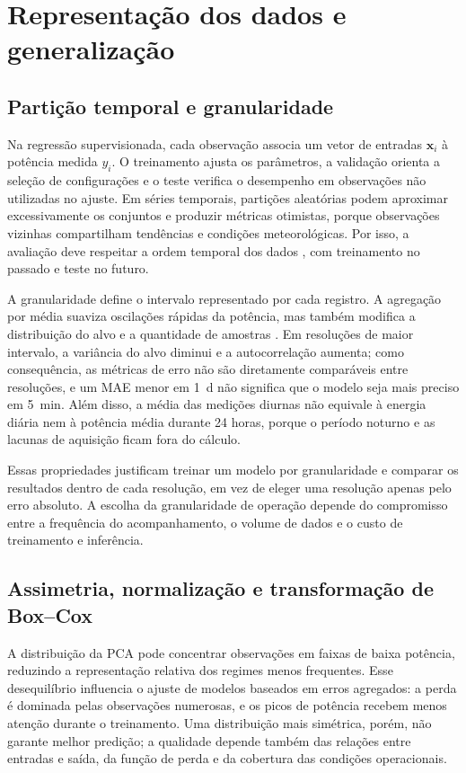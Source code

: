 {
\section{Representação dos dados e generalização}
\label{sec:ft-dados}}

\subsection{Partição temporal e granularidade}
\label{subsec:ft-granularidade}

Na regressão supervisionada, cada observação associa um vetor de
entradas $\mathbf{x}_i$ à potência medida $y_i$. O treinamento ajusta os
parâmetros, a validação orienta a seleção de configurações e o teste
verifica o desempenho em observações não utilizadas no ajuste. Em séries
temporais, partições aleatórias podem aproximar excessivamente os
conjuntos e produzir métricas otimistas, porque observações vizinhas
compartilham tendências e condições meteorológicas. Por isso, a avaliação
deve respeitar a ordem temporal dos dados \cite{roberts2017}, com
treinamento no passado e teste no futuro.

A granularidade define o intervalo representado por cada registro. A
agregação por média suaviza oscilações rápidas da potência, mas também
modifica a distribuição do alvo e a quantidade de amostras \cite{mayer2021}.
Em resoluções de maior intervalo, a variância do alvo diminui e a
autocorrelação aumenta; como consequência, as métricas de erro não são
diretamente comparáveis entre resoluções, e um MAE menor em 1~d não
significa que o modelo seja mais preciso em 5~min. Além disso, a média das
medições diurnas não equivale à energia diária nem à potência média durante
24 horas, porque o período noturno e as lacunas de aquisição ficam fora do
cálculo.

Essas propriedades justificam treinar um modelo por granularidade e
comparar os resultados dentro de cada resolução, em vez de eleger uma
resolução apenas pelo erro absoluto. A escolha da granularidade de
operação depende do compromisso entre a frequência do acompanhamento, o
volume de dados e o custo de treinamento e inferência.

\subsection{Assimetria, normalização e transformação de Box--Cox}
\label{subsec:ft-boxcox}

A distribuição da PCA pode concentrar observações em faixas de baixa
potência, reduzindo a representação relativa dos regimes menos
frequentes. Esse desequilíbrio influencia o ajuste de modelos baseados
em erros agregados: a perda é dominada pelas observações numerosas, e os
picos de potência recebem menos atenção durante o treinamento. Uma
distribuição mais simétrica, porém, não garante melhor predição; a
qualidade depende também das relações entre entradas e saída, da função
de perda e da cobertura das condições operacionais.

